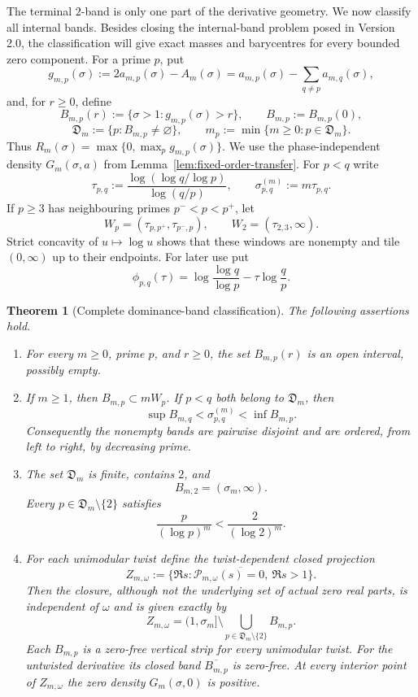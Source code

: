 \documentclass[11pt]{article}
\newtheorem{theorem}{Theorem}[section]
\theoremstyle{definition}
\theoremstyle{remark}
\newcommand{\cP}{\mathcal P}
\begin{document}
The terminal $2$-band is only one part of the derivative geometry.  We now
classify all internal bands.  Besides closing the internal-band problem posed
in Version 2.0, the classification
will give exact masses and barycentres for every bounded zero component.
For a prime $p$, put
\[
 g_{m,p}(\sigma)
 :=2a_{m,p}(\sigma)-A_m(\sigma)
 =a_{m,p}(\sigma)-\sum_{q\ne p}a_{m,q}(\sigma),
\tag{6.14}
\]
and, for $r\ge0$, define
\[
 B_{m,p}(r):=\{\sigma>1:g_{m,p}(\sigma)>r\},\qquad
 B_{m,p}:=B_{m,p}(0),
\tag{6.15}
\]
\[
 \mathfrak D_m:=\{p:B_{m,p}\ne\varnothing\},\qquad
 m_p:=\min\{m\ge0:p\in\mathfrak D_m\}.
\tag{6.16}
\]
Thus $R_m(\sigma)=\max\{0,\max_p g_{m,p}(\sigma)\}$.  We use the
phase-independent density $G_m(\sigma,a)$ from
Lemma~\ref{lem:fixed-order-transfer}.
For $p<q$ write
\[
 \tau_{p,q}:=
 \frac{\log(\log q/\log p)}{\log(q/p)},
 \qquad \sigma^{(m)}_{p,q}:=m\tau_{p,q}.
\tag{6.17}
\]
If $p\ge3$ has neighbouring primes $p^-<p<p^+$, let
\[
 W_p=(\tau_{p,p^+},\tau_{p^-,p}),
 \qquad W_2=(\tau_{2,3},\infty).
\tag{6.18}
\]
Strict concavity of $u\mapsto\log u$ shows that these windows are
nonempty and tile $(0,\infty)$ up to their endpoints.
For later use put
\[
 \phi_{p,q}(\tau)=\log\frac{\log q}{\log p}
                  -\tau\log\frac qp.
\]

\begin{theorem}[Complete dominance-band classification]
\label{thm:internal-band-classification}
The following assertions hold.
\begin{enumerate}[label=\textup{(\roman*)},leftmargin=2.2em]
\item For every $m\ge0$, prime $p$, and $r\ge0$, the set $B_{m,p}(r)$
is an open interval, possibly empty.

\item If $m\ge1$, then $B_{m,p}\subset mW_p$.  If $p<q$ both belong
to $\mathfrak D_m$, then
\[
 \sup B_{m,q}<\sigma^{(m)}_{p,q}<\inf B_{m,p}.
\tag{6.19}
\]
Consequently the nonempty bands are pairwise disjoint and are ordered,
from left to right, by decreasing prime.

\item The set $\mathfrak D_m$ is finite, contains $2$, and
\[
 B_{m,2}=(\sigma_m,\infty).
\]
Every $p\in\mathfrak D_m\setminus\{2\}$ satisfies
\[
 \frac{p}{(\log p)^m}<\frac{2}{(\log2)^m}.
\tag{6.20}
\]

\item For each unimodular twist define the twist-dependent closed
projection
\[
 Z_{m,\omega}:=
 \overline{\{\Re s:\cP_{m,\omega}(s)=0,\ \Re s>1\}}.
\]
Then the closure, although not the underlying set of actual zero real
parts, is independent of $\omega$ and is given exactly by
\[
 \boxed{
 Z_{m,\omega}=(1,\sigma_m]\setminus
 \bigcup_{p\in\mathfrak D_m\setminus\{2\}}B_{m,p}.}
\tag{6.21}
\]
Each $B_{m,p}$ is a zero-free vertical strip for every unimodular twist.
For the untwisted derivative its closed band $\overline{B_{m,p}}$ is
zero-free.  At every interior point of $Z_{m,\omega}$ the zero density
$G_m(\sigma,0)$ is positive.
\end{enumerate}
\end{theorem}
\end{document}
